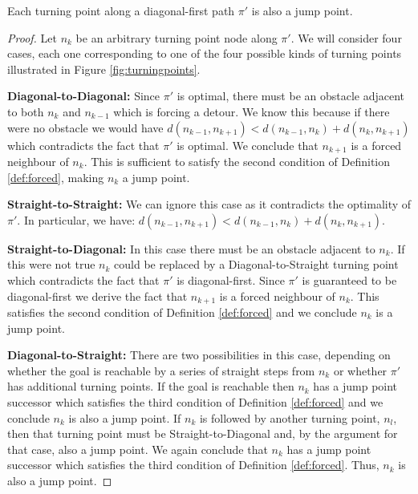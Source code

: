 \begin{lemma}
\label{lemma:turningpoints}
Each turning point along a diagonal-first path $\pi'$ is also a jump point.
\end{lemma}
\begin{proof}
Let $n_{k}$ be an arbitrary turning point node along $\pi'$. 
We will consider four cases, each one corresponding to one of the four
possible kinds of turning points illustrated in Figure \ref{fig:turningpoints}. 

\textbf{Diagonal-to-Diagonal:} Since $\pi'$ is optimal, there must be an
obstacle adjacent to both $n_{k}$ and $n_{k-1}$ which is forcing a detour.
We know this because if there were no obstacle we would have 
$d(n_{k-1}, n_{k+1}) < d(n_{k-1}, n_{k}) + d(n_{k}, n_{k+1})$ which contradicts
the fact that $\pi'$ is optimal.
We conclude that $n_{k+1}$ is a forced neighbour of $n_{k}$.
This is sufficient to satisfy the second condition of Definition
\ref{def:forced}, making $n_{k}$ a jump point.

\textbf{Straight-to-Straight:} We can ignore this case as it contradicts the 
optimality of $\pi'$. In particular, we have: 
$d(n_{k-1}, n_{k+1}) < d(n_{k-1}, n_{k}) + d(n_{k}, n_{k+1})$.

\textbf{Straight-to-Diagonal:} In this case there must be an 
obstacle adjacent to $n_{k}$. 
If this were not true $n_{k}$ could be replaced by a
Diagonal-to-Straight turning point which contradicts the fact that $\pi'$ is
diagonal-first.
Since $\pi'$ is guaranteed to be diagonal-first we derive the fact that $n_{k+1}$ is 
a forced neighbour of $n_{k}$.
This satisfies the second condition of Definition \ref{def:forced} and we conclude
$n_{k}$ is a jump point.

\textbf{Diagonal-to-Straight:} There are two possibilities in this case, 
depending on whether the goal is reachable by a series of straight steps
from $n_{k}$ or whether $\pi'$ has additional turning points. If the goal
is reachable then $n_{k}$ has a jump point successor which satisfies the
third condition of Definition \ref{def:forced} and we conclude $n_{k}$ is
also a jump point.
If $n_{k}$ is followed by another turning point, $n_{l}$, then that turning
point must be Straight-to-Diagonal and, by the argument for that case, 
also a jump point.
We again conclude that $n_{k}$ has a jump point successor which satisfies
the third condition of Definition \ref{def:forced}. Thus, $n_{k}$ is
also a jump point.
\end{proof}


